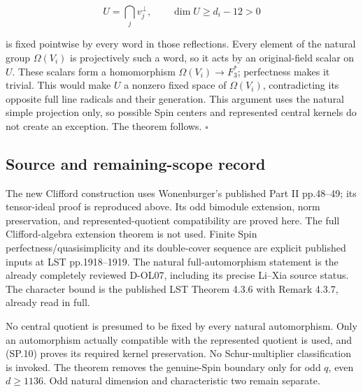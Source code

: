 \[
 U=\bigcap_j v_j^\perp,
 \qquad \dim U\ge d_i-12>0
 \tag{SP.18}
\]

is fixed pointwise by every word in those reflections. Every element of the natural group \(\Omega(V_i)\) is projectively such a word, so it acts by an original-field scalar on \(U\). These scalars form a homomorphism \(\Omega(V_i)\to F_3^*\); perfectness makes it trivial. This would make \(U\) a nonzero fixed space of \(\Omega(V_i)\), contradicting its opposite full line radicals and their generation. This argument uses the natural simple projection only, so possible Spin centers and represented central kernels do not create an exception. The theorem follows. \(\square\)

\subsection{Source and remaining-scope record}\label{source-and-remaining-scope-record}

The new Clifford construction uses Wonenburger's published Part II pp.48--49; its tensor-ideal proof is reproduced above. Its odd bimodule extension, norm preservation, and represented-quotient compatibility are proved here. The full Clifford-algebra extension theorem is not used. Finite Spin perfectness/quasisimplicity and its double-cover sequence are explicit published inputs at LST pp.1918--1919. The natural full-automorphism statement is the already completely reviewed D-OL07, including its precise Li--Xia source status. The character bound is the published LST Theorem 4.3.6 with Remark 4.3.7, already read in full.

No central quotient is presumed to be fixed by every natural automorphism. Only an automorphism actually compatible with the represented quotient is used, and (SP.10) proves its required kernel preservation. No Schur-multiplier classification is invoked. The theorem removes the genuine-Spin boundary only for odd \(q\), even \(d\ge1136\). Odd natural dimension and characteristic two remain separate.
